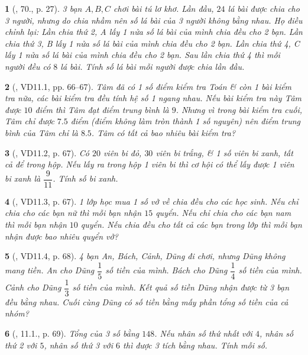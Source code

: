 \documentclass{article}
\newtheorem{baitoan}{}
\begin{document}
\begin{baitoan}[\cite{Binh_Toan_6_tap_2}, 70., p. 27]
	3 bạn $A,B,C$ chơi bài tú lơ khơ. Lần đầu, $24$ lá bài được chia cho 3 người, nhưng do chia nhầm nên số lá bài của 3 người không bằng nhau. Họ điều chỉnh lại: Lần chia thứ 2, A lấy 1 nửa số lá bài của mình chia đều cho 2 bạn. Lần chia thứ 3, B lấy 1 nửa số lá bài của mình chia đều cho 2 bạn. Lần chia thứ 4, C lấy 1 nửa số lá bài của mình chia đều cho 2 bạn. Sau lần chia thứ 4 thì mỗi người đều có $8$ lá bài. Tính số lá bài mỗi người được chia lần đầu.
\end{baitoan}

\begin{baitoan}[\cite{TLCT_THCS_Toan_6_so_hoc}, VD11.1, pp. 66--67]
	Tâm đã có 1 số điểm kiểm tra Toán \& còn 1 bài kiểm tra nữa, các bài kiểm tra đều tính hệ số 1 ngang nhau. Nếu bài kiểm tra này Tâm được $10$ điểm thì Tâm đạt điểm trung bình là $9$. Nhưng vì trong bài kiểm tra cuối, Tâm chỉ được $7.5$ điểm (điểm không làm tròn thành 1 số nguyên) nên điểm trung bình của Tâm chỉ là $8.5$. Tâm có tất cả bao nhiêu bài kiểm tra?
\end{baitoan}

\begin{baitoan}[\cite{TLCT_THCS_Toan_6_so_hoc}, VD11.2, p. 67]
	Có $20$ viên bi đỏ, $30$ viên bi trắng, \& 1 số viên bi xanh, tất cả để trong hộp. Nếu lấy ra trong hộp 1 viên bi thì cơ hội có thể lấy được 1 viên bi xanh là $\dfrac{9}{11}$. Tính số bi xanh.
\end{baitoan}

\begin{baitoan}[\cite{TLCT_THCS_Toan_6_so_hoc}, VD11.3, p. 67]
	1 lớp học mua 1 số vở về chia đều cho các học sinh. Nếu chỉ chia cho các bạn nữ thì mỗi bạn nhận $15$ quyển. Nếu chỉ chia cho các bạn nam thì mỗi bạn nhận $10$ quyển. Nếu chia đều cho tất cả các bạn trong lớp thì mỗi bạn nhận được bao nhiêu quyển vở?
\end{baitoan}

\begin{baitoan}[\cite{TLCT_THCS_Toan_6_so_hoc}, VD11.4, p. 68]
	4 bạn An, Bách, Cảnh, Dũng đi chơi, nhưng Dũng không mang tiền. An cho Dũng $\dfrac{1}{5}$ số tiền của mình. Bách cho Dũng $\dfrac{1}{4}$ số tiền của mình. Cảnh cho Dũng $\dfrac{1}{3}$ số tiền của mình. Kết quả số tiền Dũng nhận được từ 3 bạn đều bằng nhau. Cuối cùng Dũng có số tiền bằng mấy phần tổng số tiền của cả nhóm?
\end{baitoan}

\begin{baitoan}[\cite{TLCT_THCS_Toan_6_so_hoc}, 11.1., p. 69]
	Tổng của 3 số bằng $148$. Nếu nhân số thứ nhất với $4$, nhân số thứ 2 với $5$, nhân số thứ 3 với $6$ thì được 3 tích bằng nhau. Tính mỗi số.
\end{baitoan}
\end{document}
